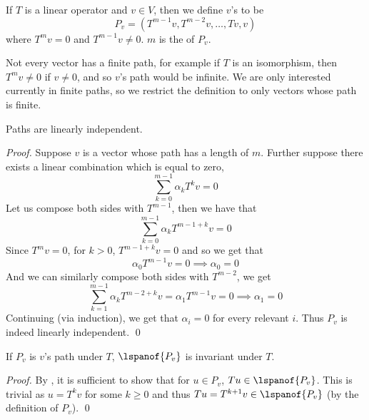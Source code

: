 \begin{defn*}

    If $T$ is a linear operator and $v\in V$, then we define $v$'s  to be
    \[ P_v = (T^{m-1}v, T^{m-2}v,\dots, Tv, v) \]
    where $T^mv=0$ and $T^{m-1}v\neq0$.
    $m$ is the  of $P_v$.

\end{defn*}

Not every vector has a finite path, for example if $T$ is an isomorphism, then $T^mv\neq0$ if $v\neq0$, and so $v$'s path would be infinite.
We are only interested currently in finite paths, so we restrict the definition to only vectors whose path is finite.

\begin{prop*}

    Paths are linearly independent.

\end{prop*}

\begin{proof}

    Suppose $v$ is a vector whose path has a length of $m$.
    Further suppose there exists a linear combination which is equal to zero,
    \[ \sum_{k=0}^{m-1}\alpha_k T^kv = 0 \]
    Let us compose both sides with $T^{m-1}$, then we have that
    \[ \sum_{k=0}^{m-1}\alpha_k T^{m-1+k}v = 0 \]
    Since $T^mv=0$, for $k>0$, $T^{m-1+k}v=0$ and so we get that
    \[ \alpha_0 T^{m-1}v = 0 \implies \alpha_0 = 0 \]
    And we can similarly compose both sides with $T^{m-2}$, we get
    \[ \sum_{k=1}^{m-1}\alpha_k T^{m-2+k}v = \alpha_1T^{m-1}v = 0 \implies \alpha_1 = 0 \]
    Continuing (via induction), we get that $\alpha_i=0$ for every relevant $i$.
    Thus $P_v$ is indeed linearly independent.
    \qed

\end{proof}

\begin{prop*}

    If $P_v$ is $v$'s path under $T$, $\lspanof{P_v}$ is invariant under $T$.

\end{prop*}

\begin{proof}

    By , it is sufficient to show that for $u\in P_v$, $Tu\in\lspanof{P_v}$.
    This is trivial as $u=T^kv$ for some $k\geq0$ and thus $Tu=T^{k+1}v\in\lspanof{P_v}$ (by the definition of $P_v$).
    \qed

\end{proof}

